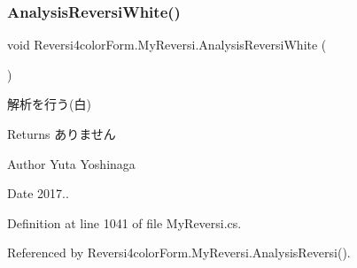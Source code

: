 \subsubsection{\texorpdfstring{Analysis\+Reversi\+White()}{AnalysisReversiWhite()}}
{\footnotesize\ttfamily void Reversi4color\+Form.\+My\+Reversi.\+Analysis\+Reversi\+White (\begin{DoxyParamCaption}{ }\end{DoxyParamCaption})\hspace{0.3cm}{\ttfamily [private]}}



解析を行う(白) 

\begin{DoxyReturn}{Returns}
ありません 
\end{DoxyReturn}
\begin{DoxyAuthor}{Author}
Yuta Yoshinaga 
\end{DoxyAuthor}
\begin{DoxyDate}{Date}
2017.. 
\end{DoxyDate}


Definition at line 1041 of file My\+Reversi.\+cs.



Referenced by Reversi4color\+Form.\+My\+Reversi.\+Analysis\+Reversi().

